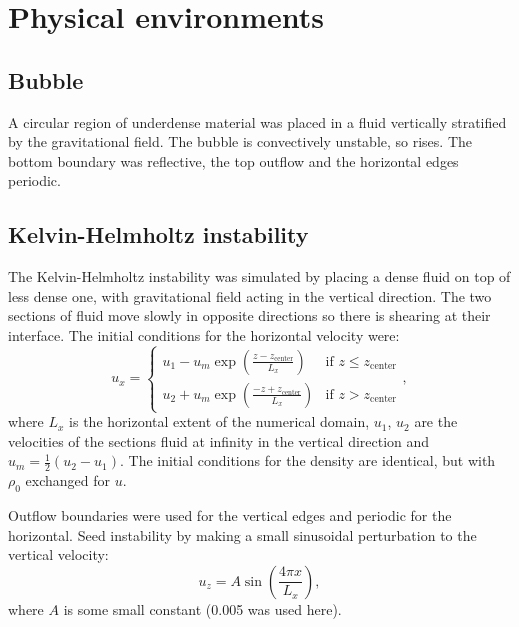 \section{Physical environments}

\subsection{Bubble}
\label{sec:Bubble}
A circular region of underdense material was placed in a fluid vertically stratified by the gravitational field. The bubble is convectively unstable, so rises. The bottom boundary was reflective, the top outflow and the horizontal edges periodic.

\subsection{Kelvin-Helmholtz instability}
\label{sec:Kelvin-Helmholtz}
The Kelvin-Helmholtz instability was simulated by placing a dense fluid on top of less dense one, with gravitational field acting in the vertical direction. The two sections of fluid move slowly in opposite directions so there is shearing at their interface. The initial conditions for the horizontal velocity were:
\begin{equation}
u_x = \begin{cases} u_1 - u_m\exp\left(\frac{z - z_\text{center}}{L_x}\right) & \text{if } z \leq z_\text{center}\\
u_2 + u_m\exp\left(\frac{-z + z_\text{center}}{L_x}\right) & \text{if } z > z_\text{center}\end{cases},
\end{equation}
where \(L_x\) is the horizontal extent of the numerical domain, \(u_1\), \(u_2\) are the velocities of the sections fluid at infinity in the vertical direction and \(u_m = \frac{1}{2}(u_2-u_1)\). The initial conditions for the density are identical, but with \(\rho_0\) exchanged for \(u\).

Outflow boundaries were used for the vertical edges and periodic for the horizontal. Seed instability by making a small sinusoidal perturbation to the vertical velocity:
\begin{equation}
u_z = A \sin\left(\frac{4 \pi x}{L_x}\right),
\end{equation}
where \(A\) is some small constant (0.005 was used here).

